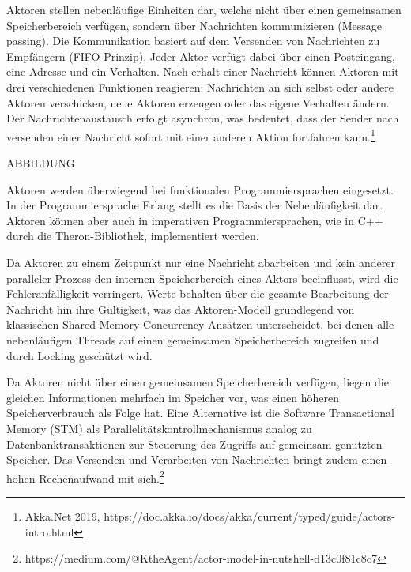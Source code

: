 Aktoren stellen nebenläufige Einheiten dar, welche nicht über einen gemeinsamen Speicherbereich verfügen, sondern über Nachrichten kommunizieren (Message passing).
Die Kommunikation basiert auf dem Versenden von Nachrichten zu Empfängern (FIFO-Prinzip).
Jeder Aktor verfügt dabei über einen Posteingang, eine Adresse und ein Verhalten.
Nach erhalt einer Nachricht können Aktoren mit drei verschiedenen Funktionen reagieren:
Nachrichten an sich selbst oder andere Aktoren verschicken, neue Aktoren erzeugen oder das eigene Verhalten ändern.
Der Nachrichtenaustausch erfolgt asynchron, was bedeutet, dass der Sender nach versenden einer Nachricht sofort mit einer anderen Aktion fortfahren kann.\footnote{Akka.Net 2019, https://doc.akka.io/docs/akka/current/typed/guide/actors-intro.html}

ABBILDUNG 

Aktoren werden überwiegend bei funktionalen Programmiersprachen eingesetzt.
In der Programmiersprache Erlang stellt es die Basis der Nebenläufigkeit dar.
Aktoren können aber auch in imperativen Programmiersprachen, wie in C++ durch die Theron-Bibliothek, implementiert werden.

Da Aktoren zu einem Zeitpunkt nur eine Nachricht abarbeiten und kein anderer paralleler Prozess den internen Speicherbereich eines Aktors beeinflusst, wird die Fehleranfälligkeit verringert.
Werte behalten über die gesamte Bearbeitung der Nachricht hin ihre Gültigkeit, was das Aktoren-Modell grundlegend von klassischen Shared-Memory-Concurrency-Ansätzen unterscheidet, bei denen alle nebenläufigen Threads auf einen gemeinsamen Speicherbereich zugreifen und durch Locking geschützt wird.

Da Aktoren nicht über einen gemeinsamen Speicherbereich verfügen, liegen die gleichen Informationen mehrfach im Speicher vor, was einen höheren Speicherverbrauch als Folge hat. 
Eine Alternative ist die Software Transactional Memory (STM) als Parallelitätskontrollmechanismus analog zu Datenbanktransaktionen zur Steuerung des Zugriffs auf gemeinsam genutzten Speicher.
Das Versenden und Verarbeiten von Nachrichten bringt zudem einen hohen Rechenaufwand mit sich.\footnote{https://medium.com/@KtheAgent/actor-model-in-nutshell-d13c0f81c8c7}
